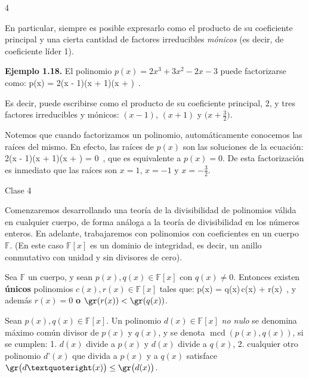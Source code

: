 \documentclass[11pt]{article}
\theoremstyle{plain}
\theoremstyle{definition}
\theoremstyle{definition}
\begin{document}
\begin{multicols}{4}
\begin{tcolorbox}[colback=blue!5!white,colframe=blue!75!black,title=\textbf{Definición (Factorización de un polinomio)}]
En particular, siempre es posible expresarlo como el producto de su coeficiente principal y una cierta cantidad de factores irreducibles \emph{mónicos} (es decir, de coeficiente líder 1).
\end{tcolorbox}

\noindent\textbf{Ejemplo 1.18.} El polinomio $p(x) = 2x^3 + 3x^2 - 2x - 3$ puede factorizarse como:
p(x) = 2(x - 1)(x + 1)\Big(x + \Big)~.

Es decir, puede escribirse como el producto de su coeficiente principal, $2$, y tres factores irreducibles y mónicos: $(x - 1)$, $(x + 1)$ y $\Big(x + \frac{3}{2}\Big)$.

\begin{observacion}[\textbf{1.7}] Notemos que cuando factorizamos un polinomio, automáticamente conocemos las raíces del mismo. En efecto, las raíces de $p(x)$ son las soluciones de la ecuación:
2(x - 1)(x + 1)\Big(x + \Big) = 0~,
que es equivalente a $p(x) = 0$. De esta factorización es inmediato que las raíces son $x = 1$, $x = -1$ y $x = -\frac{3}{2}$.
\end{observacion}

Clase 4

Comenzaremos desarrollando una teoría de la divisibilidad de polinomios válida en cualquier cuerpo, de forma análoga a la teoría de divisibilidad en los números enteros. En adelante, trabajaremos con polinomios con coeficientes en un cuerpo $\mathbb{F}$. (En este caso $\mathbb{F}[x]$ es un dominio de integridad, es decir, un anillo conmutativo con unidad y sin divisores de cero).

\begin{tcolorbox}[colback=red!5!white,colframe=red!75!black,title=\textbf{Teorema 2.2.1 (Algoritmo de la división)}]
Sea $\mathbb{F}$ un cuerpo, y sean $p(x), q(x) \in \mathbb{F}[x]$ con $q(x) \neq 0$. Entonces existen \textbf{únicos} polinomios $c(x), r(x) \in \mathbb{F}[x]$ tales que:
p(x) = q(x)\,c(x) + r(x)~,
y además $r(x) = 0$ \textbf{o} $\gr(r(x)) < \gr(q(x))$.
\end{tcolorbox}

\begin{tcolorbox}[colback=blue!5!white,colframe=blue!75!black,title=\textbf{Definición (Máximo común divisor)}]
Sean $p(x), q(x) \in \mathbb{F}[x]$. Un polinomio $d(x) \in \mathbb{F}[x]$ \emph{no nulo} se denomina máximo común divisor de $p(x)$ y $q(x)$, y se denota $\operatorname{mcd}(p(x),q(x))$, si se cumplen:
	1.	$d(x)$ divide a $p(x)$ y $d(x)$ divide a $q(x)$,
	2.	cualquier otro polinomio $d’(x)$ que divida a $p(x)$ y a $q(x)$ satisface $\gr\big(d’(x)\big) \le \gr\big(d(x)\big)$.


\end{tcolorbox}
\end{multicols}
\end{document}

